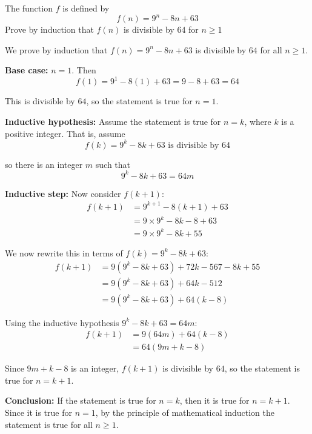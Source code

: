 \documentclass[leqno]{article}
\begin{document}
\begin{enumerate}[
  label=\textbf{\arabic*.},
  leftmargin=*,
  topsep=0pt,
  partopsep=0pt,
  parsep=0pt
]
\newpage

\questionitem

The function $f$ is defined by
\[
f(n)=9^n-8n+63 
\] 
Prove by induction that $f(n)$ is divisible by $64$ for $n \geq 1$ 

\vspace*{10pt}

\begin{djsSolution}
We prove by induction that \(f(n)=9^n-8n+63\) is divisible by \(64\) for all \(n\ge 1\).

\textbf{Base case:} \(n=1\). Then
\[
f(1)=9^1-8(1)+63=9-8+63=64
\]

This is divisible by \(64\), so the statement is true for \(n=1\).

\textbf{Inductive hypothesis:} Assume the statement is true for \(n=k\), where \(k\) is a positive integer. That is, assume
\[
f(k)=9^k-8k+63 \text{ is divisible by } 64
\]

so there is an integer \(m\) such that
\[
9^k-8k+63=64m
\]

\textbf{Inductive step:} Now consider \(f(k+1)\):
\begin{align*}
f(k+1)
&=9^{k+1}-8(k+1)+63 \\
&=9\times 9^k-8k-8+63 \\
&=9\times 9^k-8k+55
\end{align*}

We now rewrite this in terms of \(f(k)=9^k-8k+63\):
\begin{align*}
f(k+1)
&=9(9^k-8k+63)+72k-567-8k+55 \\
&=9(9^k-8k+63)+64k-512 \\
&=9(9^k-8k+63)+64(k-8)
\end{align*}

Using the inductive hypothesis \(9^k-8k+63=64m\):
\begin{align*}
f(k+1)
&=9(64m)+64(k-8) \\
&=64(9m+k-8)
\end{align*}

Since \(9m+k-8\) is an integer, \(f(k+1)\) is divisible by \(64\), so the statement is true for \(n=k+1\).

\textbf{Conclusion:} If the statement is true for \(n=k\), then it is true for \(n=k+1\). Since it is true for \(n=1\), by the principle of mathematical induction the statement is true for all \(n\ge 1\).
\end{djsSolution}



\end{enumerate}
\end{document}

